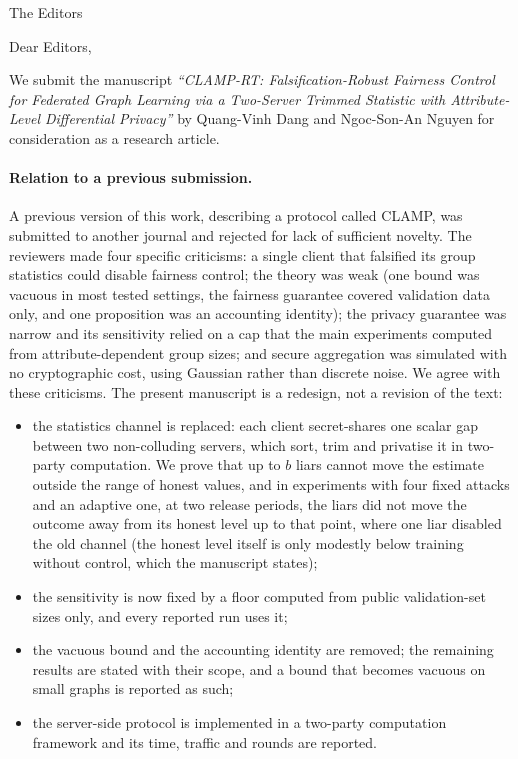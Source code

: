 \documentclass[11pt]{letter}
\date{\today}
\begin{document}
\begin{letter}{The Editors}

\opening{Dear Editors,}

We submit the manuscript \emph{``CLAMP-RT: Falsification-Robust Fairness Control for Federated Graph Learning via a Two-Server Trimmed Statistic with Attribute-Level Differential Privacy''} by Quang-Vinh Dang and Ngoc-Son-An Nguyen for consideration as a research article.

\paragraph{Relation to a previous submission.} A previous version of this work, describing a protocol called CLAMP, was submitted to another journal and rejected for lack of sufficient novelty. The reviewers made four specific criticisms: a single client that falsified its group statistics could disable fairness control; the theory was weak (one bound was vacuous in most tested settings, the fairness guarantee covered validation data only, and one proposition was an accounting identity); the privacy guarantee was narrow and its sensitivity relied on a cap that the main experiments computed from attribute-dependent group sizes; and secure aggregation was simulated with no cryptographic cost, using Gaussian rather than discrete noise. We agree with these criticisms. The present manuscript is a redesign, not a revision of the text:
\begin{itemize}
\item the statistics channel is replaced: each client secret-shares one scalar gap between two non-colluding servers, which sort, trim and privatise it in two-party computation. We prove that up to $b$ liars cannot move the estimate outside the range of honest values, and in experiments with four fixed attacks and an adaptive one, at two release periods, the liars did not move the outcome away from its honest level up to that point, where one liar disabled the old channel (the honest level itself is only modestly below training without control, which the manuscript states);
\item the sensitivity is now fixed by a floor computed from public validation-set sizes only, and every reported run uses it;
\item the vacuous bound and the accounting identity are removed; the remaining results are stated with their scope, and a bound that becomes vacuous on small graphs is reported as such;
\item the server-side protocol is implemented in a two-party computation framework and its time, traffic and rounds are reported.
\end{itemize}


\end{letter}
\end{document}

